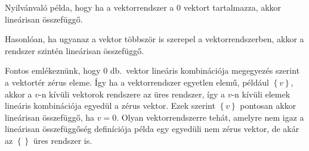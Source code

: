 \documentclass[9pt, a4paper, showtrims]{memoir}
\theoremstyle{plain}
\theoremstyle{remark}
\theoremstyle{definition}
\begin{document}
Nyilvánvaló példa, hogy ha a vektorrendszer a $0$ vektort tartalmazza,
akkor lineárisan összefüggő.

Hasonlóan, ha ugyanaz a vektor többször is szerepel a vektorrendszerben, 
akkor a rendszer szintén lineárisan összefüggő.

Fontos emlékeznünk, hogy 0 db.~vektor lineáris kombinációja megegyezés szerint a vektortér zérus eleme.
Így ha a vektorrendszer egyetlen elemű, például $\left\{ v \right\}$, akkor a $v$-n kívüli vektorok rendszere az üres rendszer, így a $v$-n kívüli elemek lineáris kombinációja egyedül a zérus vektor.
Ezek szerint $\left\{ v \right\}$ pontosan akkor lineárisan összefüggő,
ha $v=0$.
Olyan vektorrendszerre tehát, 
amelyre nem igaz a lineárisan összefüggőség definíciója példa egy egyedüli nem zérus vektor,
de akár az $\left\{  \right\}$ üres rendszer is.
\end{document}
